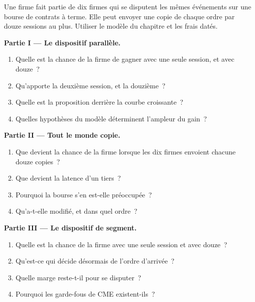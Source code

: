 \begin{problem}\label{pb:nw:futures-connectivity:1}
Une firme fait partie de dix firmes qui se disputent les mêmes événements sur une bourse de contrats à terme. Elle peut envoyer une copie de chaque ordre
par douze sessions au plus. Utiliser le modèle du chapitre et les frais datés.

\medskip\noindent\textbf{Partie I --- Le dispositif parallèle.}
\begin{enumerate}
\item Quelle est la chance de la firme de gagner avec une seule session, et avec douze~?
\item Qu'apporte la deuxième session, et la douzième~?
\item Quelle est la proposition derrière la courbe croissante~?
\item Quelles hypothèses du modèle déterminent l'ampleur du gain~?
\end{enumerate}

\medskip\noindent\textbf{Partie II --- Tout le monde copie.}
\begin{enumerate}[resume]
\item Que devient la chance de la firme lorsque les dix firmes envoient chacune douze copies~?
\item Que devient la latence d'un tiers~?
\item Pourquoi la bourse s'en est-elle préoccupée~?
\item Qu'a-t-elle modifié, et dans quel ordre~?
\end{enumerate}

\medskip\noindent\textbf{Partie III --- Le dispositif de segment.}
\begin{enumerate}[resume]
\item Quelle est la chance de la firme avec une seule session et avec douze~?
\item Qu'est-ce qui décide désormais de l'ordre d'arrivée~?
\item Quelle marge reste-t-il pour se disputer~?
\item Pourquoi les garde-fous de CME existent-ils~?
\end{enumerate}


\end{problem}
